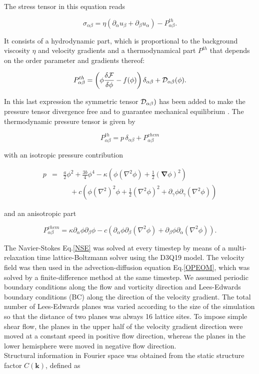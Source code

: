 \documentclass[8.5pt,twoside,twocolumn]{article}
\begin{document}
The stress tensor in this equation reads

\begin{equation}
\sigma_{\alpha \beta}=\eta (\partial_\alpha u_\beta + \partial_\beta u_\alpha)-P^{th}_{\alpha \beta}.
\end{equation}

It consists of a hydrodynamic part, which is proportional to the background viscosity $\eta$ and velocity gradients and a thermodynamical part $P^{th}$ that depends on the order parameter and gradients thereof:

\begin{equation}
P_{\alpha\beta}^{th}=\left(\phi\frac{\delta {\cal F}}{\delta \phi} -f(\phi)\right) \delta_{\alpha\beta} + {\cal D}_{\alpha \beta}(\phi).
\end{equation}  

In this last expression the symmetric tensor ${\cal D}_{\alpha\beta})$ has been added to make the pressure tensor divergence free and to guarantee mechanical equilibrium \cite{Evans79}.
The thermodynamic pressure tensor is given by

\begin{equation}
P^{th}_{\alpha \beta}=p\, \delta_{\alpha \beta} + P^{chem}_{\alpha \beta}
\end{equation}

with an isotropic pressure contribution

\begin{eqnarray}
p&=& \frac{a}{2}\phi^2+\frac{3b}{4}\phi^4-\kappa\left(\phi(\nabla^2\phi)+\frac{1}{2}({\bm \nabla}\phi)^2\right)\nonumber\\
& &\quad+c\left(\phi(\nabla^2)^2\phi+\frac{1}{2}(\nabla^2\phi)^2+\partial_{\gamma}\phi\partial_\gamma(\nabla^2\phi)\right)
\end{eqnarray}

and an anisotropic part

\begin{equation}
P^{chem}_{\alpha \beta}=\kappa\partial_\alpha\phi\partial_\beta\phi -c \left(\partial_\alpha\phi\partial_\beta(\nabla^2\phi)+\partial_\beta\phi\partial_\alpha(\nabla^2\phi)\right).
\end{equation}

The Navier-Stokes Eq.\ref{NSE} was solved at every timestep by means of a multi-relaxation time lattice-Boltzmann solver \cite{dHumieres02,Adhikari05} using the D3Q19 model.
The velocity field was then used in the advection-diffusion equation Eq.\ref{OPEOM}, which was solved by a finite-difference method at the same timestep. 
We assumed periodic boundary conditions along the flow and vorticity direction and Lees-Edwards boundary conditions (BC) \cite{Wagner02} along the direction of the velocity gradient.
The total number of Lees-Edwards planes was varied according to the size of the simulation so that the distance of two planes was always 16 lattice sites.
To impose simple shear flow, the planes in the upper half of the velocity gradient direction were moved at a constant speed in positive flow direction, whereas the planes in the lower hemisphere were moved in negative flow direction.\\
Structural information in Fourier space was obtained from the static structure factor $C({\mathbf k})$, defined as
\end{document}
